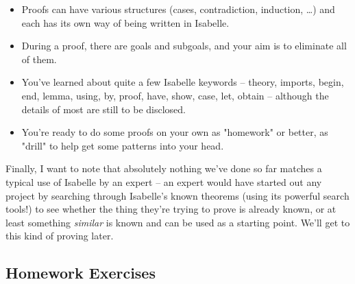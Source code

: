 \begin{itemize}
    \item Proofs can have various structures (cases, contradiction, induction, …) and each has its own way of being written in Isabelle. 
    \item During a proof, there are goals and subgoals, and your aim is to eliminate all of them. 
    \item You've learned about quite a few Isabelle keywords -- theory, imports, begin, end, lemma, using, by, proof, have, show, case, let, obtain -- although the details of most are still to be disclosed. 
    \item You're ready to do some proofs on your own as "homework" or better, as "drill" to help get some patterns into your head. 
\end{itemize}

Finally, I want to note that absolutely nothing we've done so far matches a typical use of Isabelle by an expert -- an expert would have started out any project by searching through Isabelle's known theorems (using its powerful search tools!) to see whether the thing they're trying to prove is already known, or at least something \textit{similar} is known and can be used as a starting point. We'll get to this kind of proving later. 

\subsection{Homework Exercises}

